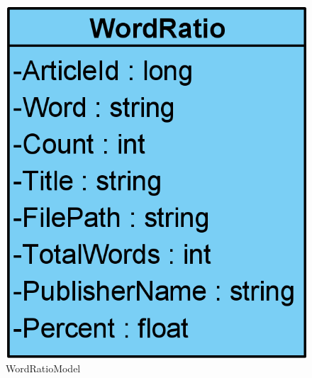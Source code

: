 \begin{figure}[H]
    \centering
    \includegraphics[scale=0.25]{Images/WordRatioModel.png}
    \caption{WordRatioModel}
    \label{WordRatioModel}
\end{figure}